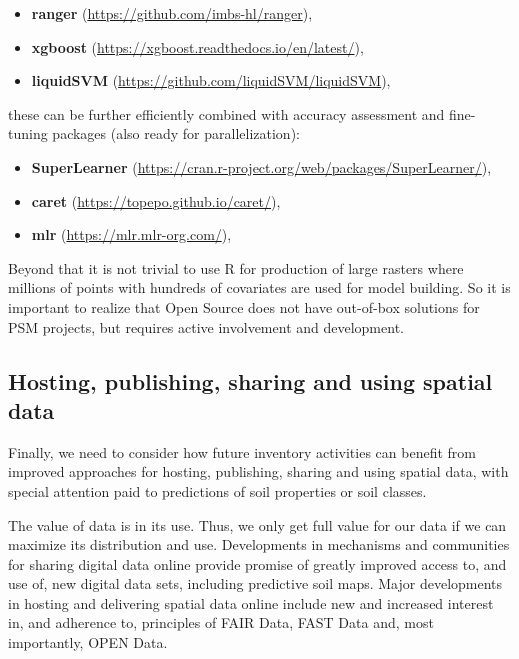 \documentclass[graybox,natbib,nospthms,UStrade]{svmono}
\begin{document}
\begin{itemize}
\item
  \textbf{ranger} (\url{https://github.com/imbs-hl/ranger}),
\item
  \textbf{xgboost} (\url{https://xgboost.readthedocs.io/en/latest/}),
\item
  \textbf{liquidSVM} (\url{https://github.com/liquidSVM/liquidSVM}),
\end{itemize}

these can be further efficiently combined with accuracy assessment
and fine-tuning packages (also ready for parallelization):

\begin{itemize}
\item
  \textbf{SuperLearner} (\url{https://cran.r-project.org/web/packages/SuperLearner/}),
\item
  \textbf{caret} (\url{https://topepo.github.io/caret/}),
\item
  \textbf{mlr} (\url{https://mlr.mlr-org.com/}),
\end{itemize}

Beyond that it is not trivial to use R for production of large rasters where
millions of points with hundreds of covariates are used for model building.
So it is important to realize that Open Source does not have out-of-box
solutions for PSM projects, but requires active involvement and development.

\hypertarget{hosting-publishing-sharing-and-using-spatial-data}{%
\subsection{Hosting, publishing, sharing and using spatial data}\label{hosting-publishing-sharing-and-using-spatial-data}}

Finally, we need to consider how future inventory activities can benefit
from improved approaches for hosting, publishing, sharing and using
spatial data, with special attention paid to predictions of soil
properties or soil classes.

The value of data is in its use. Thus, we only get full value for our
data if we can maximize its distribution and use. Developments in
mechanisms and communities for sharing digital data online provide
promise of greatly improved access to, and use of, new digital data
sets, including predictive soil maps.
Major developments in hosting and delivering spatial data online include
new and increased interest in, and adherence to, principles of FAIR
Data, FAST Data and, most importantly, OPEN Data.
\end{document}
